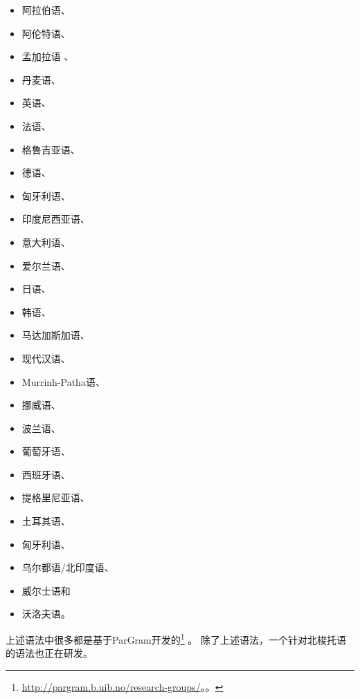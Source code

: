 \begin{itemize}
\item 阿拉伯语\citep{Attia2008a-u}、
\item 阿伦特语\citep*{Dras2012a-u}、
\item 孟加拉语 \citep{SC97a-u}、
\item 丹麦语\citep{Oersnes2002b-u,OW2003a-u,OW2004a-u}、
\item 英语\citep*{HHP91a-u,BDFK99a-u,RKKCMJ2002a-u,KM2007a-u}、
\item 法语\citep*{Zweigenbaum91a-u,Frank96b-u,FZ2002a-u,BDFK99a-u,CK2001a-u,BSL2005a-u,SdA2016a-u,Alencar2017a-u}、
%
%
\item 格鲁吉亚语\citep{Meurer2009a-u}、
\item 德语\citep{Rohrer96a,Berman96a-u,KR97a-u,BDFK99a-u,Dipper2003a-u,RF2006a,Forst2006a-u,Frank2006a-u,FR2009a-u}、
\item 匈牙利语\citep{LRT2010a-u}、
\item 印度尼西亚语\citep*{AADMS2009a-u}、
\item 意大利语\citep*{Delmonte90a-u,Mayo99a-u,Quaglia2012a-u}、
\item 爱尔兰语\citep{Sulger2009a-u,Sulger2010a-u}、
\item 日语\citep*{HHP91a-u,MO2003a-u,Umemoto2006a-u}、
\item 韩语\citep*{HHP91a-u}、
\item 马达加斯加语\citep*{Randriamasimanana2006a-u,DLM2006a-u}、
\item 现代汉语\citep*{HHP91a-u,FK2007a-u}、
\item Murrinh-Patha语\citep{SN2012a-u}、
\item 挪威语\citep*{DMR2005a}、
\item 波兰语\citep*{PP2012a-u}、
\item 葡萄牙语\citep{Alencar2004a-u,Alencar2013a-u,Alencar2015a-u}、
\item 西班牙语\citep{Mayo99a-u}、
\item 提格里尼亚语\citep{Kifle2012a-u}、
\item 土耳其语\citep{CO2006a-u}、
\item 匈牙利语\citep*{LRT2010a-u,RLC2011a-u}、
\item 乌尔都语/北印度语\citep*{BHKR2007a-u,BBS2008a-u}、
\item 威尔士语\citep{MS2005a-u}和
\item 沃洛夫语\citep{Dione2012b-u,Dione2013a-u}。
\end{itemize}
上述语法中很多都是基于ParGram开发的\footnote{%
  \url{http://pargram.b.uib.no/research-groups/}。。
} \citep*{BKNS99a-ed,BDKMR02a-u}。 
除了上述语法，一个针对北梭托语的语法也正在研发\citep{Faasz2010a-u}。

